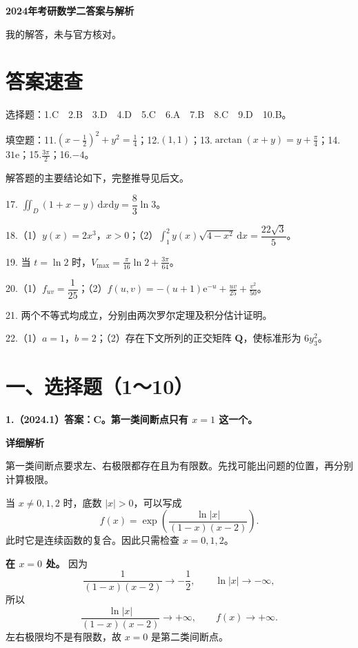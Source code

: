 \documentclass[UTF8,11pt,fontset=windows]{ctexart}
\begin{document}
{\LARGE\bfseries 2024年考研数学二答案与解析\par}\vspace{6pt}

\begingroup\color{gray}我的解答，未与官方核对。\par\endgroup

\section*{答案速查}

\begingroup\color{gray}选择题：1.C　2.B　3.D　4.D　5.C　6.A　7.B　8.C　9.D　10.B。

填空题：11.$(x-\tfrac12)^2+y^2=\tfrac14$；12.$(1,1)$；13.$\arctan(x+y)=y+\tfrac\pi4$；14.$31\mathrm e$；15.$\tfrac{3\pi}{2}$；16.$-4$。\par\endgroup

解答题的主要结论如下，完整推导见后文。

17. $\displaystyle\iint_D(1+x-y)\,\mathrm dx\mathrm dy=\dfrac83\ln3$。

18.（1）$y(x)=2x^3$，$x>0$；（2）$\displaystyle\int_1^2y(x)\sqrt{4-x^2}\,\mathrm dx=\dfrac{22\sqrt3}{5}$。

19. 当 $t=\ln2$ 时，$\displaystyle V_{\max}=\frac{\pi}{16}\ln2+\frac{3\pi}{64}$。

20.（1）$f_{uv}=\dfrac1{25}$；（2）$\displaystyle f(u,v)=-(u+1)\mathrm e^{-u}+\frac{uv}{25}+\frac{v^2}{50}$。

21. 两个不等式均成立，分别由两次罗尔定理及积分估计证明。

22.（1）$a=1$，$b=2$；（2）存在下文所列的正交矩阵 $\boldsymbol Q$，使标准形为 $6y_3^2$。

\clearpage

\section*{一、选择题（1～10）}

\textbf{1.（2024.1）答案：C。第一类间断点只有 $x=1$ 这一个。}

\textbf{详细解析}

第一类间断点要求左、右极限都存在且为有限数。先找可能出问题的位置，再分别计算极限。

当 $x\ne0,1,2$ 时，底数 $|x|>0$，可以写成
$$
f(x)=\exp\!\left(\frac{\ln|x|}{(1-x)(x-2)}\right).
$$
此时它是连续函数的复合。因此只需检查 $x=0,1,2$。

\textbf{在 $x=0$ 处。} 因为
$$
\frac1{(1-x)(x-2)}\longrightarrow-\frac12,
\qquad \ln|x|\longrightarrow-\infty,
$$
所以
$$
\frac{\ln|x|}{(1-x)(x-2)}\longrightarrow+\infty,
\qquad f(x)\longrightarrow+\infty.
$$
左右极限均不是有限数，故 $x=0$ 是第二类间断点。
\end{document}
